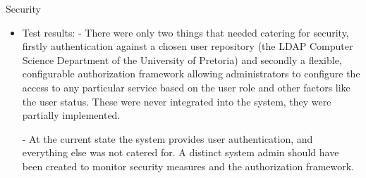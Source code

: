 \item Security

\begin{itemize}


\item Test results:
- There were only two things that needed catering for security, firstly authentication against a chosen user repository (the LDAP Computer Science Department of the University of Pretoria) and secondly a flexible, configurable authorization framework allowing administrators to configure the access to any particular service based on the user role and other factors like the user status. These were never integrated into the system, they were partially implemented.

- At the current state the system provides user authentication, and everything else was not catered for. A distinct system admin should have been created to monitor security measures and the authorization framework. \\



\end{itemize}